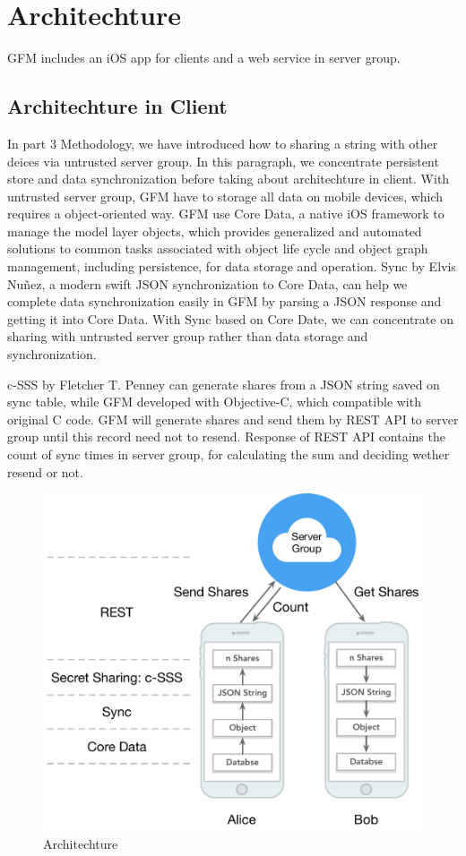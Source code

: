 \documentclass[twocolumn,10pt]{article}
\begin{document}
\section{Architechture}
GFM includes an iOS app for clients and a web service in server group.

\subsection{Architechture in Client}
In part 3 Methodology, we have introduced how to sharing a string with other deices via untrusted server group. In this paragraph, we concentrate persistent store and data synchronization before taking about architechture in client. With untrusted server group, GFM have to storage all data on mobile devices, which requires a object-oriented way. GFM use Core Data\cite{coredata}, a native iOS framework to manage the model layer objects, which provides generalized and automated solutions to common tasks associated with object life cycle and object graph management, including persistence, for data storage and operation. Sync\cite{sync} by Elvis Nuñez, a modern swift JSON synchronization to Core Data, can help we complete data synchronization easily in GFM by parsing a JSON response and getting it into Core Data. With Sync based on Core Date, we can concentrate on sharing with untrusted server group rather than data storage and synchronization.

c-SSS by Fletcher T. Penney can generate shares from a JSON string saved on sync table, while GFM developed with Objective-C, which compatible with original C code. GFM will generate shares and send them by REST API to server group until this record need not to resend. Response of REST API contains the count of sync times in server group, for calculating the sum and deciding wether resend or not.

\begin{figure}[t]
\centering
\includegraphics[scale=0.4]{architechture}
\caption{Architechture}
\end{figure}
\end{document}
